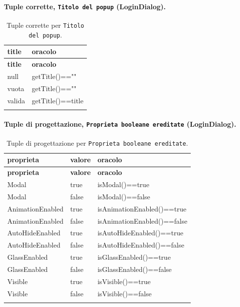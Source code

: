 \paragraph*{Tuple corrette, \texttt{Titolo del popup} (LoginDialog).}

{\footnotesize\setlength{\tabcolsep}{3pt}
\begin{longtable}{>{\raggedright\arraybackslash}p{}>{\raggedright\arraybackslash}p{}}
\toprule
\textbf{title} & \textbf{oracolo} \\
\midrule
\endfirsthead
\toprule
\textbf{title} & \textbf{oracolo} \\
\midrule
\endhead
\bottomrule
\endfoot
null & getTitle()=="" \\
vuota & getTitle()=="" \\
valida & getTitle()==title \\
\bottomrule
\caption{Tuple corrette per \texttt{Titolo del popup}.}
\label{tab:logindialog-title-tuple-corrette}
\end{longtable}
}



\paragraph*{Tuple di progettazione, \texttt{Proprieta booleane ereditate} (LoginDialog).}

{\footnotesize\setlength{\tabcolsep}{3pt}
\begin{longtable}{>{\raggedright\arraybackslash}p{}>{\raggedright\arraybackslash}p{}>{\raggedright\arraybackslash}p{}}
\toprule
\textbf{proprieta} & \textbf{valore} & \textbf{oracolo} \\
\midrule
\endfirsthead
\toprule
\textbf{proprieta} & \textbf{valore} & \textbf{oracolo} \\
\midrule
\endhead
\bottomrule
\endfoot
Modal & true & isModal()==true \\
Modal & false & isModal()==false \\
AnimationEnabled & true & isAnimationEnabled()==true \\
AnimationEnabled & false & isAnimationEnabled()==false \\
AutoHideEnabled & true & isAutoHideEnabled()==true \\
AutoHideEnabled & false & isAutoHideEnabled()==false \\
GlassEnabled & true & isGlassEnabled()==true \\
GlassEnabled & false & isGlassEnabled()==false \\
Visible & true & isVisible()==true \\
Visible & false & isVisible()==false \\
\bottomrule
\caption{Tuple di progettazione per \texttt{Proprieta booleane ereditate}.}
\label{tab:logindialog-boolprop-tuple}
\end{longtable}
}



